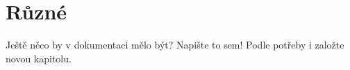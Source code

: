 \documentclass[12pt,a4paper,titlepage,final]{report}
\begin{document}
\section{Různé}

Ještě něco by v dokumentaci mělo být? Napište to sem! Podle potřeby i založte
novou kapitolu.



\nocite{pgr-raytracing}
\nocite{aurelius}
\nocite{pgp-optimalizace}
\nocite{cuda-doc}
\nocite{phong-wiki}
\nocite{so-stack}
\nocite{bvh}
\nocite{cmemory}



\end{document}
